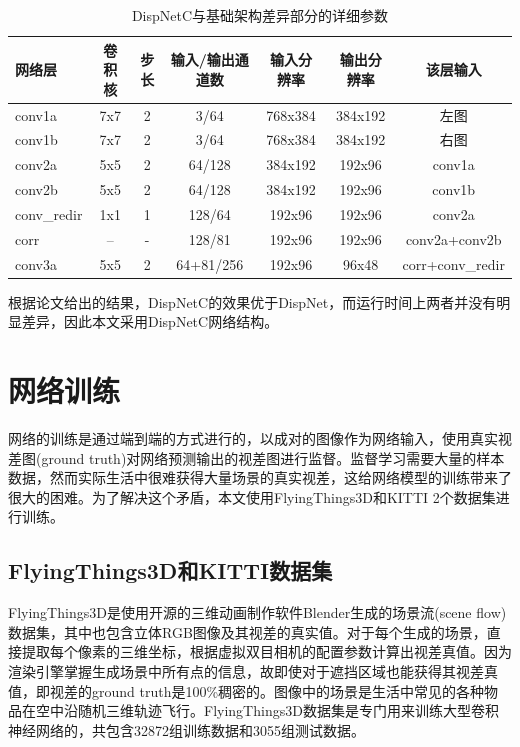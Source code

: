 \begin{table}[htbp]
	\centering
	\caption{DispNetC与基础架构差异部分的详细参数}
	\label{tab:4_1_DispNetC_architecture}
	\begin{small}
		\begin{tabular}{|l|c c c|c c|c|}\hline
			网络层  & 卷积核 & 步长 & 输入/输出通道数 & 输入分辨率 & 输出分辨率 & 该层输入 \\\hline
			conv1a             & 7x7 & 2 & 3/64                & 768x384 & 384x192 & 左图 \\
			conv1b             & 7x7 & 2 & 3/64                & 768x384 & 384x192 & 右图 \\
			conv2a             & 5x5 & 2 & 64/128           & 384x192  & 192x96    & conv1a \\
			conv2b             & 5x5 & 2 & 64/128           & 384x192  & 192x96    & conv1b \\
			conv\_redir      & 1x1 & 1 & 128/64            & 192x96    & 192x96    & conv2a \\
			corr                   & --   &  - & 128/81            & 192x96    & 192x96    & conv2a+conv2b \\
			conv3a            & 5x5 & 2 & 64+81/256    & 192x96    & 96x48      & corr+conv\_redir \\\hline
		\end{tabular}
	\end{small}
\end{table}

根据论文\cite{mayer2016large}给出的结果，DispNetC的效果优于DispNet，而运行时间上两者并没有明显差异，因此本文采用DispNetC网络结构。

\section{网络训练}
网络的训练是通过端到端的方式进行的，以成对的图像作为网络输入，使用真实视差图(ground truth)对网络预测输出的视差图进行监督。监督学习需要大量的样本数据，然而实际生活中很难获得大量场景的真实视差，这给网络模型的训练带来了很大的困难。为了解决这个矛盾，本文使用FlyingThings3D和KITTI 2个数据集进行训练。

\subsection{FlyingThings3D和KITTI数据集}
FlyingThings3D\cite{mayer2016large}是使用开源的三维动画制作软件Blender生成的场景流(scene flow)数据集，其中也包含立体RGB图像及其视差的真实值。对于每个生成的场景，直接提取每个像素的三维坐标，根据虚拟双目相机的配置参数计算出视差真值。因为渲染引擎掌握生成场景中所有点的信息，故即使对于遮挡区域也能获得其视差真值，即视差的ground truth是100\%稠密的。图像中的场景是生活中常见的各种物品在空中沿随机三维轨迹飞行。FlyingThings3D数据集是专门用来训练大型卷积神经网络的，共包含32872组训练数据和3055组测试数据。

